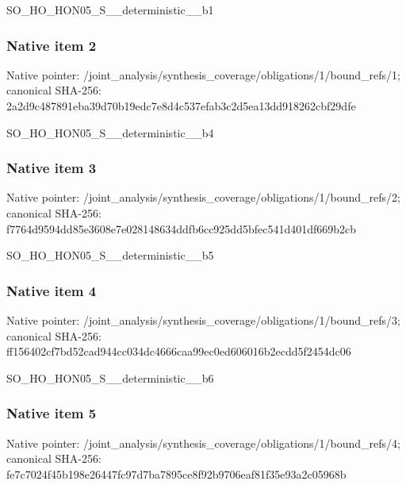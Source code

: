 \documentclass[10pt,a4paper]{article}
\begin{document}
\begingroup\raggedright\sloppy SO\_\allowbreak{}HO\_\allowbreak{}HON05\_\allowbreak{}S\_\allowbreak{}\_\allowbreak{}deterministic\_\allowbreak{}\_\allowbreak{}b1\par\endgroup

\subsubsection{Native item 2}
Native pointer: /joint\_\allowbreak{}analysis/synthesis\_\allowbreak{}coverage/obligations/1/bound\_\allowbreak{}refs/1; canonical SHA-256: 2a2d9c487891eba39d70b19edc7e8d4c537efab3c2d5ea13dd918262cbf29dfe

\begingroup\raggedright\sloppy SO\_\allowbreak{}HO\_\allowbreak{}HON05\_\allowbreak{}S\_\allowbreak{}\_\allowbreak{}deterministic\_\allowbreak{}\_\allowbreak{}b4\par\endgroup

\subsubsection{Native item 3}
Native pointer: /joint\_\allowbreak{}analysis/synthesis\_\allowbreak{}coverage/obligations/1/bound\_\allowbreak{}refs/2; canonical SHA-256: f7764d9594dd85e3608e7e028148634ddfb6cc925dd5bfec541d401df669b2cb

\begingroup\raggedright\sloppy SO\_\allowbreak{}HO\_\allowbreak{}HON05\_\allowbreak{}S\_\allowbreak{}\_\allowbreak{}deterministic\_\allowbreak{}\_\allowbreak{}b5\par\endgroup

\subsubsection{Native item 4}
Native pointer: /joint\_\allowbreak{}analysis/synthesis\_\allowbreak{}coverage/obligations/1/bound\_\allowbreak{}refs/3; canonical SHA-256: ff156402cf7bd52cad944cc034dc4666caa99ec0ed606016b2ecdd5f2454dc06

\begingroup\raggedright\sloppy SO\_\allowbreak{}HO\_\allowbreak{}HON05\_\allowbreak{}S\_\allowbreak{}\_\allowbreak{}deterministic\_\allowbreak{}\_\allowbreak{}b6\par\endgroup

\subsubsection{Native item 5}
Native pointer: /joint\_\allowbreak{}analysis/synthesis\_\allowbreak{}coverage/obligations/1/bound\_\allowbreak{}refs/4; canonical SHA-256: fe7c7024f45b198e26447fc97d7ba7895ce8f92b9706eaf81f35e93a2c05968b
\end{document}
